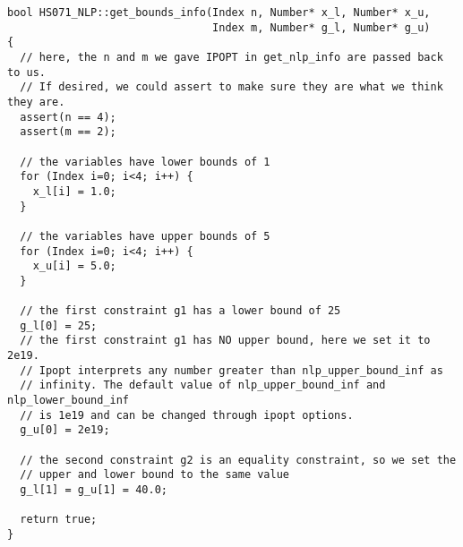 \documentclass[letter,10pt]{article}
\begin{document}
\begin{footnotesize}
\begin{verbatim}
bool HS071_NLP::get_bounds_info(Index n, Number* x_l, Number* x_u,
                                Index m, Number* g_l, Number* g_u)
{
  // here, the n and m we gave IPOPT in get_nlp_info are passed back to us.
  // If desired, we could assert to make sure they are what we think they are.
  assert(n == 4);
  assert(m == 2);

  // the variables have lower bounds of 1
  for (Index i=0; i<4; i++) {
    x_l[i] = 1.0;
  }

  // the variables have upper bounds of 5
  for (Index i=0; i<4; i++) {
    x_u[i] = 5.0;
  }

  // the first constraint g1 has a lower bound of 25
  g_l[0] = 25;
  // the first constraint g1 has NO upper bound, here we set it to 2e19.
  // Ipopt interprets any number greater than nlp_upper_bound_inf as 
  // infinity. The default value of nlp_upper_bound_inf and nlp_lower_bound_inf
  // is 1e19 and can be changed through ipopt options.
  g_u[0] = 2e19;

  // the second constraint g2 is an equality constraint, so we set the 
  // upper and lower bound to the same value
  g_l[1] = g_u[1] = 40.0;

  return true;
}
\end{verbatim}
\end{footnotesize}
\end{document}
